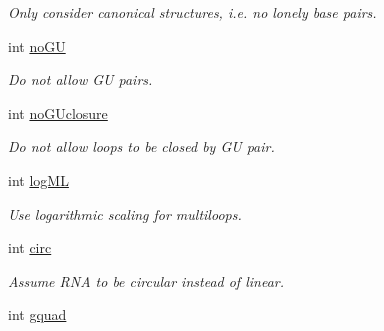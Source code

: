 \begin{DoxyCompactItemize}
\begin{DoxyCompactList}\small\item\em Only consider canonical structures, i.\+e. no \textquotesingle{}lonely\textquotesingle{} base pairs. \end{DoxyCompactList}\item 
int \hyperlink{structvrna__md__s_ad64a5eaf9c4550e7525b36a725fec4b2}{no\+GU}\hypertarget{structvrna__md__s_ad64a5eaf9c4550e7525b36a725fec4b2}{}\label{structvrna__md__s_ad64a5eaf9c4550e7525b36a725fec4b2}

\begin{DoxyCompactList}\small\item\em Do not allow GU pairs. \end{DoxyCompactList}\item 
int \hyperlink{structvrna__md__s_a7e883db1f33f8f3baa5c9b140350c78e}{no\+G\+Uclosure}\hypertarget{structvrna__md__s_a7e883db1f33f8f3baa5c9b140350c78e}{}\label{structvrna__md__s_a7e883db1f33f8f3baa5c9b140350c78e}

\begin{DoxyCompactList}\small\item\em Do not allow loops to be closed by GU pair. \end{DoxyCompactList}\item 
int \hyperlink{structvrna__md__s_ae259f89a94acae0c7f1412603e7f57b5}{log\+ML}\hypertarget{structvrna__md__s_ae259f89a94acae0c7f1412603e7f57b5}{}\label{structvrna__md__s_ae259f89a94acae0c7f1412603e7f57b5}

\begin{DoxyCompactList}\small\item\em Use logarithmic scaling for multiloops. \end{DoxyCompactList}\item 
int \hyperlink{structvrna__md__s_a92762e1008503d4623ff5c01e358a464}{circ}\hypertarget{structvrna__md__s_a92762e1008503d4623ff5c01e358a464}{}\label{structvrna__md__s_a92762e1008503d4623ff5c01e358a464}

\begin{DoxyCompactList}\small\item\em Assume R\+NA to be circular instead of linear. \end{DoxyCompactList}\item 
int \hyperlink{structvrna__md__s_af88a511a2b1f526b4c6213de6cb8fd6e}{gquad}\hypertarget{structvrna__md__s_af88a511a2b1f526b4c6213de6cb8fd6e}{}\label{structvrna__md__s_af88a511a2b1f526b4c6213de6cb8fd6e}


\end{DoxyCompactItemize}
